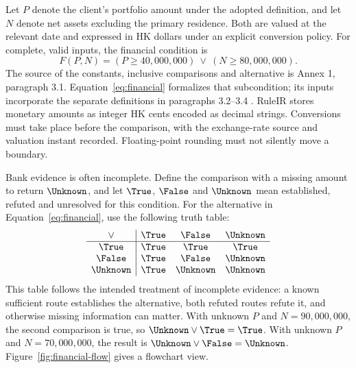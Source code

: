 \label{sec:semantics}

Let $P$ denote the client's portfolio amount under the adopted definition, and
let $N$ denote net assets excluding the primary residence. Both are valued at the
relevant date and expressed in HK dollars under an explicit conversion policy.
For complete, valid inputs, the financial condition is
\begin{equation}
 F(P,N)=(P\geq 40{,}000{,}000)\ \lor\ (N\geq 80{,}000{,}000).
 \label{eq:financial}
\end{equation}
The source of the constants, inclusive comparisons and alternative is Annex 1,
paragraph 3.1. Equation~\eqref{eq:financial} formalizes that subcondition; its
inputs incorporate the separate definitions in paragraphs 3.2--3.4
\citep{sfcspiannex1}. RuleIR stores monetary amounts as
integer HK cents encoded as decimal strings. Conversions must take place
before the comparison, with the exchange-rate source and valuation instant
recorded. Floating-point rounding must not silently move a boundary.

Bank evidence is often incomplete. Define the comparison with a missing amount
to return $\Unknown$, and let $\True$, $\False$ and $\Unknown$ mean established,
refuted and unresolved for this condition. For the alternative in
Equation~\eqref{eq:financial}, use the following truth table:
\begin{equation}
\begin{array}{c|ccc}
\lor & \True & \False & \Unknown\\\hline
\True & \True & \True & \True\\
\False & \True & \False & \Unknown\\
\Unknown & \True & \Unknown & \Unknown
\end{array}
\label{eq:or}
\end{equation}
This table follows the intended treatment of incomplete evidence: a known
sufficient route establishes the alternative, both refuted routes refute it,
and otherwise missing information can matter. With unknown $P$ and
$N=90{,}000{,}000$, the second comparison is true, so
$\Unknown\lor\True=\True$. With unknown $P$ and $N=70{,}000{,}000$, the result
is $\Unknown\lor\False=\Unknown$. Figure~\ref{fig:financial-flow} gives a
flowchart view.


